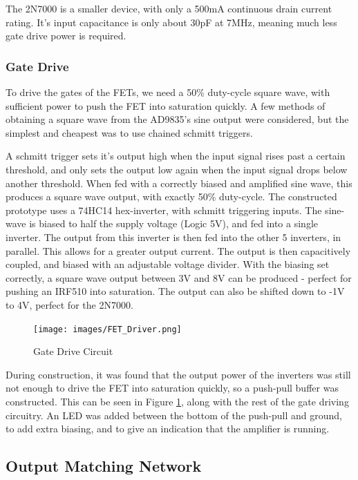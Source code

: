 \documentclass[a4paper,12pt]{article}
\begin{document}
The 2N7000 is a smaller device, with only a 500mA continuous drain current rating. It's input capacitance is only about 30pF at 7MHz, meaning much less gate drive power is required. 


\subsubsection{Gate Drive}
To drive the gates of the FETs, we need a 50\% duty-cycle square wave, with sufficient power to push the FET into saturation quickly. A few methods of obtaining a square wave from the AD9835's sine output were considered, but the simplest and cheapest was to use chained schmitt triggers.

A schmitt trigger sets it's output high when the input signal rises past a certain threshold, and only sets the output low again when the input signal drops below another threshold. When fed with a correctly biased and amplified sine wave, this produces a square wave output, with exactly 50\% duty-cycle. The constructed prototype uses a 74HC14 hex-inverter, with schmitt triggering inputs. The sine-wave is biased to half the supply voltage (Logic 5V), and fed into a single inverter. The output from this inverter is then fed into the other 5 inverters, in parallel. This allows for a greater output current. The output is then capacitively coupled, and biased with an adjustable voltage divider. With the biasing set correctly, a square wave output between 3V and 8V can be produced - perfect for pushing an IRF510 into saturation. The output can also be shifted down to -1V to 4V, perfect for the 2N7000.

\begin{figure}[h]
  \begin{center}
    \texttt{[image: images/FET\_Driver.png]}
  \end{center}
  \caption{Gate Drive Circuit}
  \label{fig:fet_drive}
\end{figure}

During construction, it was found that the output power of the inverters was still not enough to drive the FET into saturation quickly, so a push-pull buffer was constructed. This can be seen in Figure \ref{fig:fet_drive}, along with the rest of the gate driving circuitry. An LED was added between the bottom of the push-pull and ground, to add extra biasing, and to give an indication that the amplifier is running.

\subsection{Output Matching Network}
\end{document}

